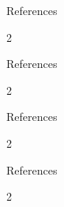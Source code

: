\documentclass[aspectratio=169]{beamer}
\begin{document}
%
\begin{frame}{References}
  \begin{multicols}{2}
    \printbibliography[heading=none,category=refspagea]
  \end{multicols}
\end{frame}
\begin{frame}{References}
  \begin{multicols}{2}
    \printbibliography[heading=none,category=refspageb]
  \end{multicols}
\end{frame}
\begin{frame}{References}
  \begin{multicols}{2}
    \printbibliography[heading=none,category=refspagec]
  \end{multicols}
\end{frame}
\begin{frame}{References}
  \begin{multicols}{2}
    \printbibliography[heading=none,category=refspaged]
  \end{multicols}
\end{frame}

















\end{document}

